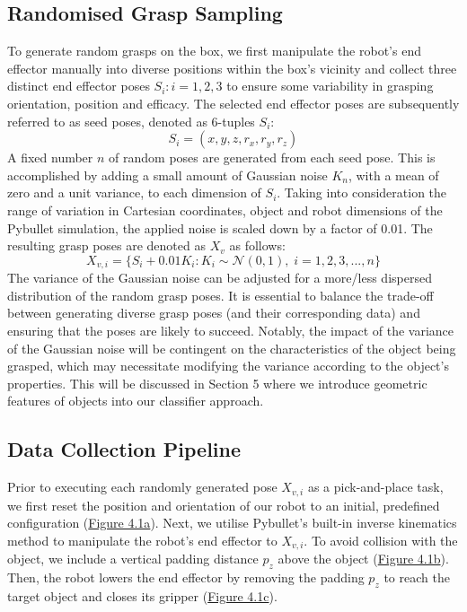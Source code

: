 \documentclass[11pt, a4paper]{report}
\begin{document}
\subsection{Randomised Grasp Sampling}\label{sec:4.2.1}
To generate random grasps on the box, we first manipulate the robot's end effector manually into diverse positions within the box's vicinity and collect three distinct end effector poses $S_i:i=1,2,3$ to ensure some variability in grasping orientation, position and efficacy. The selected end effector poses are subsequently referred to as seed poses, denoted as 6-tuples $S_i$:
\begin{equation}
    S_i=(x,y,z,r_x,r_y,r_z)
\end{equation}
A fixed number $n$ of random poses are generated from each seed pose. This is accomplished by adding a small amount of Gaussian noise $K_n$, with a mean of zero and a unit variance, to each dimension of $S_i$. Taking into consideration the range of variation in Cartesian coordinates, object and robot dimensions of the Pybullet simulation, the applied noise is scaled down by a factor of 0.01. The resulting grasp poses are denoted as $X_v$ as follows:
\begin{equation}
    X_{v,i}=\Big\{S_i+0.01K_i:K_i\sim\mathcal{N}(0,1),\;i=1,2,3,...,n\Big\}
\end{equation}
The variance of the Gaussian noise can be adjusted for a more/less dispersed distribution of the random grasp poses. It is essential to balance the trade-off between generating diverse grasp poses (and their corresponding data) and ensuring that the poses are likely to succeed. Notably, the impact of the variance of the Gaussian noise will be contingent on the characteristics of the object being grasped, which may necessitate modifying the variance according to the object's properties. This will be discussed in Section 5 where we introduce geometric features of objects into our classifier approach.
 

\newpage
\subsection{Data Collection Pipeline}\label{sec:4.2.2}
Prior to executing each randomly generated pose $X_{v,i}$ as a pick-and-place task, we first reset the position and orientation of our robot to an initial, predefined configuration (\hyperref[fig:4.1a]{Figure 4.1a}). Next, we utilise Pybullet's built-in inverse kinematics method to manipulate the robot's end effector to $X_{v,i}$. To avoid collision with the object, we include a vertical padding distance $p_z$ above the object (\hyperref[fig:4.1b]{Figure 4.1b}). Then, the robot lowers the end effector by removing the padding $p_z$ to reach the target object and closes its gripper (\hyperref[fig:4.1c]{Figure 4.1c}).
\end{document}
